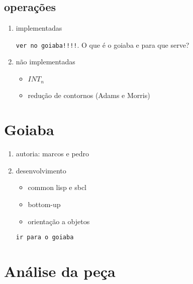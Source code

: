 \documentclass[12pt,a4paper]{article}
\begin{document}
\subsection{operações}

\begin{enumerate}
\item implementadas

  \texttt{ver no goiaba!!!!}. O que é o goiaba e para que serve?
\item não implementadas
  \begin{itemize}
  \item $INT_n$
  \item redução de contornos (Adams e Morris)
  \end{itemize}
\end{enumerate}

\section{Goiaba}

\begin{enumerate}
\item autoria: marcos e pedro
\item desenvolvimento
  \begin{itemize}
  \item common lisp e sbcl
  \item bottom-up
  \item orientação a objetos
  \end{itemize}
\texttt{ir para o goiaba}
\end{enumerate}

\section{Análise da peça}
\end{document}
